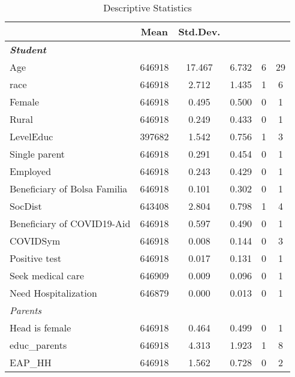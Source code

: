 \documentclass[a4paper, 12pt]{article}
\begin{document}
\newpage
\begin{table}[htbp]\centering
\caption{Descriptive Statistics}
\begin{tabular}{l*{1}{ccccc}}
\hline\hline
            &\multicolumn{1}{c}{{Mean}}&\multicolumn{1}{l}{{Std.Dev.}}&            &            &            \\
\hline
\textbf{\emph{Student}}&            &            &            &            &            \\
Age         &      646918&      17.467&       6.732&           6&          29\\
race        &      646918&       2.712&       1.435&           1&           6\\
Female      &      646918&       0.495&       0.500&           0&           1\\
Rural       &      646918&       0.249&       0.433&           0&           1\\
LevelEduc   &      397682&       1.542&       0.756&           1&           3\\
Single parent &      646918&       0.291&       0.454&           0&           1\\
Employed    &      646918&       0.243&       0.429&           0&           1\\
Beneficiary of Bolsa Familia&      646918&       0.101&       0.302&           0&           1\\
SocDist     &      643408&       2.804&       0.798&           1&           4\\
Beneficiary of COVID19-Aid&      646918&       0.597&       0.490&           0&           1\\
COVIDSym    &      646918&       0.008&       0.144&           0&           3\\
Positive test&      646918&       0.017&       0.131&           0&           1\\
Seek medical care&      646909&       0.009&       0.096&           0&           1\\
Need Hospitalization&      646879&       0.000&       0.013&           0&           1\\
\emph{Parents}&            &            &            &            &            \\
Head is female&      646918&       0.464&       0.499&           0&           1\\
educ\_parents&      646918&       4.313&       1.923&           1&           8\\
EAP\_HH      &      646918&       1.562&       0.728&           0&           2\\

\end{tabular}
\end{table}
\end{document}
